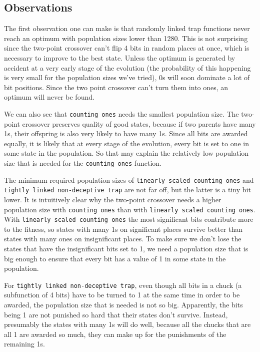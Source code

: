 \documentclass[12pt]{article}
\theoremstyle{definition}
\newcommand{\co}{\texttt{counting ones}}
\newcommand{\lsco}{\texttt{linearly scaled counting ones}}
\newcommand{\tnt}{\texttt{tightly linked non-deceptive trap}}
\begin{document}
\subsection*{Observations}
The first observation one can make is that randomly linked trap functions never reach an optimum with population sizes lower than 1280.
This is not surprising since the two-point crossover can't flip 4 bits in random places at once,
which is necessary to improve to the best state.
Unless the optimum is generated by accident at a very early stage of the evolution
(the probability of this happening is very small for the population sizes we've tried),
0s will soon dominate a lot of bit positions.
Since the two point crossover can't turn them into ones, an optimum will never be found.

We can also see that \co{} needs the smallest population size.
The two-point crossover preserves quality of good states, because if two parents have many 1s,
their offspring is also very likely to have many 1s.
Since all bits are awarded equally, it is likely that at every stage of the evolution,
every bit is set to one in some state in the population.
So that may explain the relatively low population size that is needed for the \co{} function.

The minimum required population sizes of \lsco{} and \tnt{} are not far off,
but the latter is a tiny bit lower.
It is intuitively clear why the two-point crossover needs a higher population size
with \co{} than with \lsco{}.
With \lsco{} the most significant bits contribute more to the fitness, so states with many 1s
on significant places survive better than states with many ones on insignificant places.
To make sure we don't lose the states that have the insignificant bits set to 1, we need
a population size that is big enough to ensure that every bit has a value of 1
in some state in the population.

For \tnt{}, even though all bits in a chuck (a subfunction of 4 bits) have to be turned to 1
at the same time in order to be awarded, the population size that is needed is not so big.
Apparently, the bits being 1 are not punished so hard that their states don't survive.
Instead, presumably the states with many 1s will do well, because all the chucks that
are all 1 are awarded so much, they can make up for the punishments of the remaining 1s.
\end{document}
